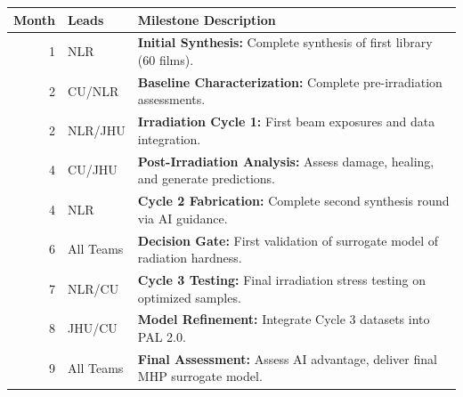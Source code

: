 \documentclass[pgs]{DOE}
\begin{document}

%

\begin{center}
\begin{tabular}{@{}rll@{}}
\toprule
\textbf{Month} & \textbf{Leads} & \textbf{Milestone Description} \\ \midrule
1 & NLR & \textbf{Initial Synthesis:} Complete synthesis of first library (60 films). \\
2 & CU/NLR & \textbf{Baseline Characterization:} Complete pre-irradiation assessments. \\
2 & NLR/JHU & \textbf{Irradiation Cycle 1:} First beam exposures and data integration. \\
4 & CU/JHU & \textbf{Post-Irradiation Analysis:} Assess damage, healing, and generate predictions. \\
4 & NLR & \textbf{Cycle 2 Fabrication:} Complete second synthesis round via AI guidance. \\
6 & All Teams & \textbf{Decision Gate:} First validation of surrogate model of radiation hardness. \\
7 & NLR/CU & \textbf{Cycle 3 Testing:} Final irradiation stress testing on optimized samples. \\
8 & JHU/CU & \textbf{Model Refinement:} Integrate Cycle 3 datasets into PAL 2.0. \\
9 & All Teams & \textbf{Final Assessment:} Assess AI advantage, deliver final MHP surrogate model. \\ \bottomrule
\end{tabular}
\end{center}
\end{document}

